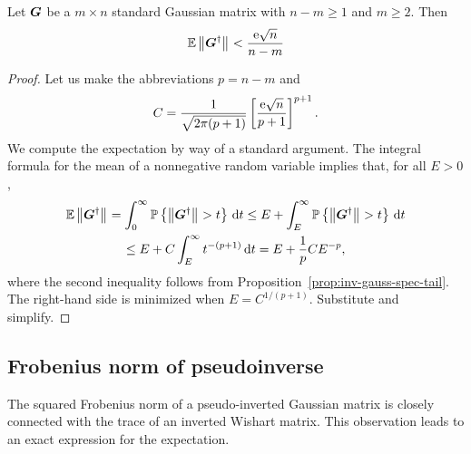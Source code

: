 \documentclass[final]{siamltex}
\newcommand{\notate}[1]{\textcolor{red}{\textbf{[#1]}}}
\begin{document}
\begin{appendix}
\lsp

\begin{proposition} \label{prop:inv-gauss-spec-expect}
Let $\bm{G}$ be a $m \times n$ standard Gaussian matrix
with $n-m \geq 1$ and $m \geq 2$.  Then
$$
\Expect \smnorm{}{\mtx{G}^\psinv}
    < %
    \frac{\econst\sqrt{n}}{n-m}
$$
\end{proposition}



\begin{proof}
Let us make the abbreviations $p = n - m$ and
$$
C = \frac{1}{\sqrt{2\pi(p+1)}} \left[
\frac{\mathrm{e}\sqrt{n}}{p+1}\right]^{p+1}.
$$
We compute the expectation by way of a standard argument.  The
integral formula for the mean of a nonnegative random variable
implies that, for all $E > 0$,
\begin{multline*}
\operatorname{\mathbb{E}} {\bigl\Vert {\bm{G}^\dagger} \bigr\Vert}_{}
    = \int_0^{\infty} \mathbb{P}\left\{ { {\bigl\Vert {\bm{G}^\dagger} \bigr\Vert}_{} > t } \right\}\, \mathrm{d}{t}
    \leq E + \int_E^{\infty} \mathbb{P}\left\{ { {\bigl\Vert {\bm{G}^\dagger} \bigr\Vert}_{} > t } \right\}\, \mathrm{d}{t} \\
    \leq E + C \int_E^\infty t^{-(p+1)} \, \mathrm{d}{t}
    = E + \frac{1}{p} C E^{-p},
\end{multline*}
where the second inequality follows from Proposition~\ref{prop:inv-gauss-spec-tail}.
The right-hand side is minimized when $E = C^{1/(p+1)}$.
Substitute and simplify.
\end{proof}


\subsection{Frobenius norm of pseudoinverse}

The squared Frobenius norm of a pseudo-inverted Gaussian matrix is
closely connected with the trace of an inverted Wishart matrix.
This observation leads to an exact expression for the expectation.


\end{appendix}
\end{document}
